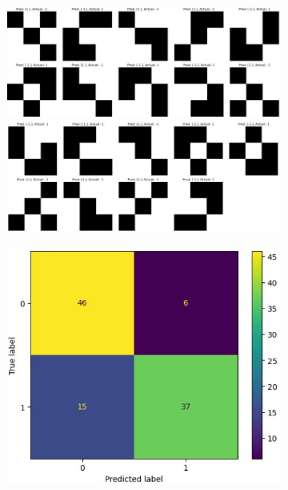 \documentclass[a4paper]{article}
\begin{document}
\begin{figure}[h]
\centering
\begin{subfigure}{.5\textwidth}
  \centering
\includegraphics[height = 0.4\textwidth]{assets/2.jpeg}
\includegraphics[height = 0.4\textwidth]{assets/1.jpeg}
\end{subfigure}%
\begin{subfigure}{.5\textwidth}
  \centering
\includegraphics[height = 0.8\textwidth]{assets/confmat.jpeg}
\end{subfigure}%
\end{figure}%
\end{document}
